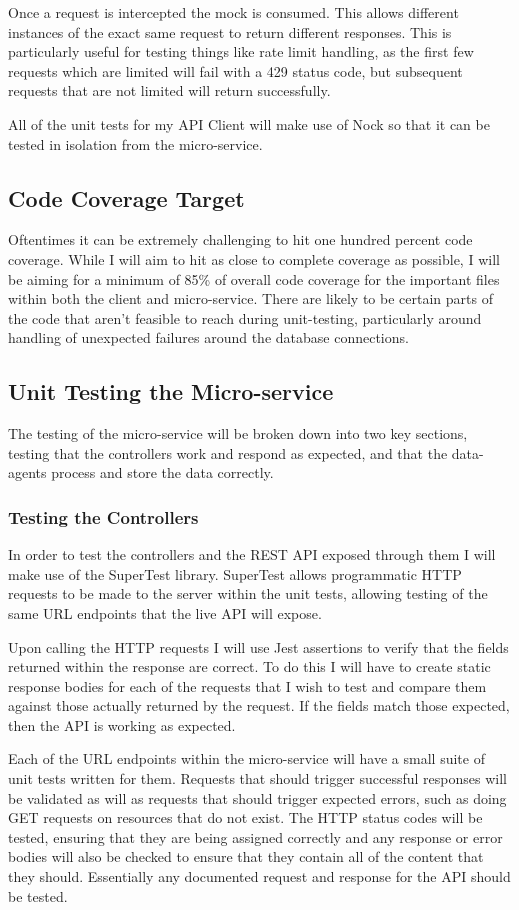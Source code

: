 Once a request is intercepted the mock is consumed. This allows different instances of the exact same request to return different responses. This is particularly useful for testing things like rate limit handling, as the first few requests which are limited will fail with a 429 status code, but subsequent requests that are not limited will return successfully.

All of the unit tests for my API Client will make use of Nock so that it can be tested in isolation from the micro-service.
\subsection{Code Coverage Target}
Oftentimes it can be extremely challenging to hit one hundred percent code coverage. While I will aim to hit as close to complete coverage as possible, I will be aiming for a minimum of 85\% of overall code coverage for the important files within both the client and micro-service. There are likely to be certain parts of the code that aren't feasible to reach during unit-testing, particularly around handling of unexpected failures around the database connections.
\subsection{Unit Testing the Micro-service}
The testing of the micro-service will be broken down into two key sections, testing that the controllers work and respond as expected, and that the data-agents process and store the data correctly.
\subsubsection{Testing the Controllers}
In order to test the controllers and the REST API exposed through them I will make use of the SuperTest library. SuperTest allows programmatic HTTP requests to be made to the server within the unit tests, allowing testing of the same URL endpoints that the live API will expose.

Upon calling the HTTP requests I will use Jest assertions to verify that the fields returned within the response are correct. To do this I will have to create static response bodies for each of the requests that I wish to test and compare them against those actually returned by the request. If the fields match those expected, then the API is working as expected.

Each of the URL endpoints within the micro-service will have a small suite of unit tests written for them. Requests that should trigger successful responses will be validated as will as requests that should trigger expected errors, such as doing GET requests on resources that do not exist. The HTTP status codes will be tested, ensuring that they are being assigned correctly and any response or error bodies will also be checked to ensure that they contain all of the content that they should. Essentially any documented request and response for the API should be tested.
